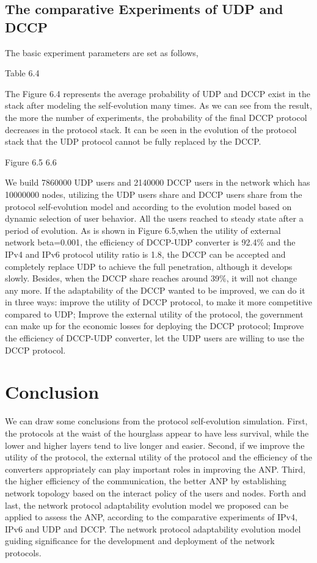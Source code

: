 \documentclass{article}
\begin{document}
\subsection{The comparative Experiments of UDP and DCCP}
The basic experiment parameters are set as follows,

Table 6.4

The Figure 6.4 represents the average probability of UDP and DCCP exist in the stack after modeling the self-evolution many
times. As we can see from the result, the more the number of experiments, the probability of the final DCCP protocol decreases
in the protocol stack.  It can be seen in the evolution of the protocol stack that the UDP protocol cannot be fully replaced by the DCCP.

Figure 6.5 6.6

We build 7860000 UDP users and 2140000 DCCP users in the network which has 10000000 nodes, utilizing the UDP users share and
DCCP users share from the protocol self-evolution model and according to the evolution model based on dynamic selection of
user behavior. All the users reached to steady state after a period of evolution. As is shown in Figure 6.5,when the
utility of external network beta=0.001, the efficiency of DCCP-UDP converter is 92.4\% and the IPv4 and IPv6 protocol utility
ratio is 1.8, the DCCP can be accepted and completely replace UDP to achieve the full penetration, although it develops slowly.
Besides, when the DCCP share reaches around 39\%, it will not change any more. If the adaptability of the DCCP wanted to be improved,
we can do it in three ways: improve the utility of DCCP protocol, to make it more competitive compared to UDP; Improve the external
utility of the protocol, the government can make up for the economic losses for deploying the DCCP protocol; Improve the efficiency of
DCCP-UDP converter, let the UDP users are willing to use the DCCP protocol.
\section{Conclusion}
We can draw some conclusions from the protocol self-evolution simulation. First,  the protocols at the waist of the hourglass
appear to have less survival, while the lower and higher layers tend to live longer and easier. Second, if we improve the
utility of the protocol, the external utility of the protocol and the efficiency of the converters appropriately can play
important roles in improving the ANP. Third, the higher efficiency of the communication, the better ANP by establishing
network topology based on the interact policy of the users and nodes. Forth and last, the network protocol adaptability
evolution model we proposed can be applied to assess the ANP, according to the comparative experiments of IPv4, IPv6 and
UDP and DCCP. The network protocol adaptability evolution model guiding significance for the development and deployment
of the network protocols.
\end{document}
